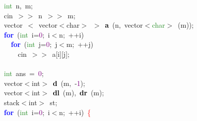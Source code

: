 {\ttfamily \raggedright {
\noindent
\mbox{}\textcolor{ForestGreen}{int}\ n\textcolor{BrickRed}{,}\ m\textcolor{BrickRed}{;} \\
\mbox{}cin\ \textcolor{BrickRed}{$>$$>$}\ n\ \textcolor{BrickRed}{$>$$>$}\ m\textcolor{BrickRed}{;} \\
\mbox{}vector\ \textcolor{BrickRed}{$<$}\ \textcolor{TealBlue}{vector$<$char$>$\ $>$}\ \textbf{\textcolor{Black}{a}}\ \textcolor{BrickRed}{(}n\textcolor{BrickRed}{,}\ vector\textcolor{BrickRed}{$<$}\textcolor{ForestGreen}{char}\textcolor{BrickRed}{$>$}\ \textcolor{BrickRed}{(}m\textcolor{BrickRed}{));} \\
\mbox{}\textbf{\textcolor{Blue}{for}}\ \textcolor{BrickRed}{(}\textcolor{ForestGreen}{int}\ i\textcolor{BrickRed}{=}\textcolor{Purple}{0}\textcolor{BrickRed}{;}\ i\textcolor{BrickRed}{$<$}n\textcolor{BrickRed}{;}\ \textcolor{BrickRed}{++}i\textcolor{BrickRed}{)} \\
\mbox{}\ \ \textbf{\textcolor{Blue}{for}}\ \textcolor{BrickRed}{(}\textcolor{ForestGreen}{int}\ j\textcolor{BrickRed}{=}\textcolor{Purple}{0}\textcolor{BrickRed}{;}\ j\textcolor{BrickRed}{$<$}m\textcolor{BrickRed}{;}\ \textcolor{BrickRed}{++}j\textcolor{BrickRed}{)} \\
\mbox{}\ \ \ \ cin\ \textcolor{BrickRed}{$>$$>$}\ a\textcolor{BrickRed}{[}i\textcolor{BrickRed}{][}j\textcolor{BrickRed}{];} \\
\mbox{} \\
\mbox{}\textcolor{ForestGreen}{int}\ ans\ \textcolor{BrickRed}{=}\ \textcolor{Purple}{0}\textcolor{BrickRed}{;} \\
\mbox{}\textcolor{TealBlue}{vector$<$int$>$}\ \textbf{\textcolor{Black}{d}}\ \textcolor{BrickRed}{(}m\textcolor{BrickRed}{,}\ \textcolor{BrickRed}{-}\textcolor{Purple}{1}\textcolor{BrickRed}{);} \\
\mbox{}\textcolor{TealBlue}{vector$<$int$>$}\ \textbf{\textcolor{Black}{dl}}\ \textcolor{BrickRed}{(}m\textcolor{BrickRed}{),}\ \textbf{\textcolor{Black}{dr}}\ \textcolor{BrickRed}{(}m\textcolor{BrickRed}{);} \\
\mbox{}\textcolor{TealBlue}{stack$<$int$>$}\ st\textcolor{BrickRed}{;} \\
\mbox{}\textbf{\textcolor{Blue}{for}}\ \textcolor{BrickRed}{(}\textcolor{ForestGreen}{int}\ i\textcolor{BrickRed}{=}\textcolor{Purple}{0}\textcolor{BrickRed}{;}\ i\textcolor{BrickRed}{$<$}n\textcolor{BrickRed}{;}\ \textcolor{BrickRed}{++}i\textcolor{BrickRed}{)}\ \textcolor{Red}{\{} \\
}}
